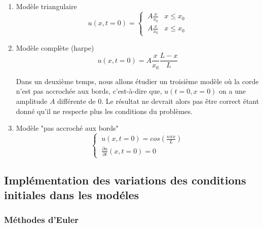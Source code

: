 \begin{enumerate}
    \item Modèle triangulaire
    \begin{equation}
       u(x,t=0)=\left\{
            \begin{array}{ll}
               \ A \frac{x}{x_{0}} &  x\leq x_{0} \\
               \ A \frac{x}{x_{0}} &  x\leq x_{0}
            \end{array}
        \right.
    \end{equation}
    
    
    
    \item Modèle complète (harpe)
    \begin{equation}
        u(x,t=0)=A\frac{x}{x_{0}}\frac{L-x}{L}
    \end{equation}
    
    
Dans un deuxième temps, nous allons étudier un troisième modèle où la corde n'est pas accrochée aux bords, c'est-à-dire que, $u(t=0,x=0)$ on a une amplitude $A$ différente de $0$. Le résultat ne devrait alors pas être correct étant donné qu'il ne respecte plus les conditions du problèmes.

 \item Modèle "pas accroché aux bords"
    \begin{equation}
       \left\{
            \begin{array}{ll}
               \  u(x,t=0)=cos(\frac{n \pi x}{L})  \\
               \ \frac{\partial{u}}{\partial{t}}(x,t=0)=0 
            \end{array}
        \right.
    \end{equation}
    
    
    
    
    
    
\end{enumerate}


    
\subsection{Implémentation des variations des conditions initiales dans les modéles}

\subsubsection{Méthodes d'Euler}

